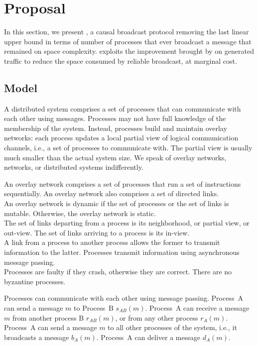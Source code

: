 
\section{Proposal}
\label{sec:proposal}

In this section, we present \RPCBROADCAST, a causal broadcast protocol removing
the last linear upper bound in terms of number of processes that ever broadcast
a message that remained on space complexity. \RPCBROADCAST exploits the
improvement brought by \PCBROADCAST on generated traffic to reduce the space
consumed by reliable broadcast, at marginal cost.

\subsection{Model}

A distributed system comprises a set of processes that can communicate with each
other using messages. Processes may not have full knowledge of the membership of
the system. Instead, processes build and maintain overlay networks: each process
updates a local partial view of logical communication channels, i.e., a set of
processes to communicate with. The partial view is usually much smaller than the
actual system size. We speak of overlay networks, networks, or distributed
systems indifferently.

\begin{definition}
  An overlay network comprises a set of processes that run a set of instructions
  sequentially.  An overlay network also comprises a set of directed
  links. \\
  An overlay network is dynamic if the set of processes or the set of links is
  mutable. Otherwise, the overlay network is static. \\
  The set of links departing from a process is its neighborhood, or partial
  view, or out-view. The set of links arriving to a process is its in-view. \\
  A link from a process to another process allows the former to transmit
  information to the latter. Processes transmit information using asynchronous
  message passing.\\
  Processes are faulty if they crash, otherwise they are correct. There are no
  byzantine processes.
\end{definition}

Processes can communicate with each other using message passing. Process~A can
send a message $m$ to Process~B $s_{AB}(m)$. Process~A can receive a message $m$
from another process B $r_{AB}(m)$, or from any other process
$r_A(m)$. Process~A can send a message $m$ to all other processes of the system,
i.e., it broadcasts a message $b_A(m)$. Process~A can deliver a message
$d_A(m)$.

